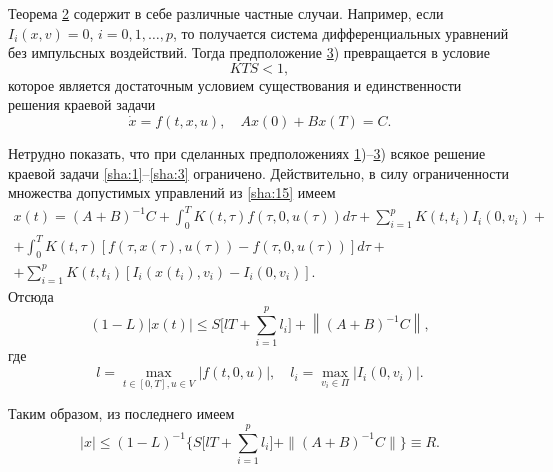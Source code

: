 \smallskip

\begin{remark}[1] Теорема \hyperlink{sha:th2}{2} содержит в себе различные частные случаи. Например, если $I_{i}(x,v)=0$, $i=0, 1, \dots, p$, то получается система дифференциальных уравнений без импульсных воздействий. Тогда предположение \hyperlink{sha:3)}{3}) превращается  в условие
\begin{equation} \label{sha:18} 
KTS<1,                                                                                      
\end{equation} 
которое является достаточным условием существования и единственности решения краевой задачи
\begin{equation} \label{sha:19} 
\dot{x}=f(t,x,u), \quad  
Ax(0)+Bx(T)=C. 
\end{equation} 
\end{remark}

\smallskip

Нетрудно показать, что при сделанных предположениях {\rm \hyperlink{sha:1)}{1})--\hyperlink{sha:3)}{3})} всякое решение краевой задачи \eqref{sha:1}--\eqref{sha:3} ограничено. 
Действительно, в силу ограниченности множества  допустимых управлений из \eqref{sha:15} имеем
\begin{multline} \label{sha:21} 
x(t)=(A+B)^{-1} C+\int_{0}^{T}K(t,\tau)f(\tau, 0,u(\tau))d\tau  +\sum _{i=1}^{p}K(t,t_{i} )I_{i} (0, v_{i}) +
\\ 
+\int_{0}^{T}K(t,\tau)[f(\tau,x(\tau),u(\tau))-f(\tau, 0,u(\tau))]d\tau +
\\
+\sum _{i=1}^{p}K(t,t_{i})\left[I_{i}(x(t_{i}),v_{i})-I_{i}(0,v_{i})\right].
\end{multline} 
Отсюда
\begin{equation} \label{sha:22} 
(1-L)|x(t)|\le S\biggl[lT+\sum _{i=1}^{p}l_{i}\biggr]+\left\|(A+B)^{-1}C\right\|,
\end{equation} 
где $$l=\mathop{\max}\limits_{t\in[0, T],u\in V}|f(t, 0, u)|,\quad l_{i}=\mathop{\max}\limits_{v_{i} \in \Pi} \left|I_{i}(0, v_{i})\right|.$$



Таким образом, из последнего имеем
\begin{equation} \label{sha:23} 
|x|\le(1-L)^{-1}\biggl\{ S\biggl 
[lT+\sum _{i=1}^{p}l_{i}\biggr]+ \|(A+B)^{-1} C \| \biggr\}\equiv R.                 
\end{equation} 



